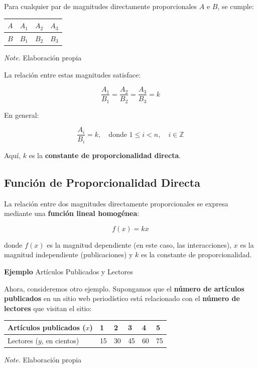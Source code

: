 \documentclass[
  stu,
  floatsintext,
  longtable,
  a4paper,
  nolmodern,
  notxfonts,
  notimes,
  colorlinks=true,linkcolor=blue,citecolor=blue,urlcolor=blue]{apa7}
\begin{document}
Para cualquier par de magnitudes directamente proporcionales \(A\) e
\(B\), se cumple:

\begin{table}

{\caption{{Magnitudes directamente
proporcionales}{\label{tbl-mytable2}}}}

\begin{longtable}[]{@{}llll@{}}
\toprule\noalign{}
\(A\) & \(A_1\) & \(A_2\) & \(A_3\) \\
\midrule\noalign{}
\endhead
\bottomrule\noalign{}
\endlastfoot
\(B\) & \(B_1\) & \(B_2\) & \(B_3\) \\
\end{longtable}

{\noindent \emph{Note.} Elaboración propia}

\end{table}

La relación entre estas magnitudes satisface:

\[
\frac{A_1}{B_1} = \frac{A_2}{B_2} = \frac{A_3}{B_3} = k
\]

En general:

\[
\frac{A_i}{B_i} = k, \quad \text{donde } 1 \leq i < n, \quad i \in \mathbb{Z}
\]

Aquí, \(k\) es la \textbf{constante de proporcionalidad directa}.

\subsection{Función de Proporcionalidad
Directa}\label{funciuxf3n-de-proporcionalidad-directa}

La relación entre dos magnitudes directamente proporcionales se expresa
mediante una \textbf{función lineal homogénea}:

\[
f(x) = kx
\]

donde \(f(x)\) es la magnitud dependiente (en este caso, las
interacciones), \(x\) es la magnitud independiente (publicaciones) y
\(k\) es la constante de proporcionalidad.

\textbf{Ejemplo} Artículos Publicados y Lectores

Ahora, consideremos otro ejemplo. Supongamos que el \textbf{número de
artículos publicados} en un sitio web periodístico está relacionado con
el \textbf{número de lectores} que visitan el sitio:

\begin{table}

{\caption{{Relación entre Artículos publicados y
Lectores}{\label{tbl-mytable8}}}}

\begin{longtable}[]{@{}llllll@{}}
\toprule\noalign{}
Artículos publicados (\(x\)) & 1 & 2 & 3 & 4 & 5 \\
\midrule\noalign{}
\endhead
\bottomrule\noalign{}
\endlastfoot
Lectores (\(y\), en cientos) & 15 & 30 & 45 & 60 & 75 \\
\end{longtable}

{\noindent \emph{Note.} Elaboración propia}

\end{table}
\end{document}
